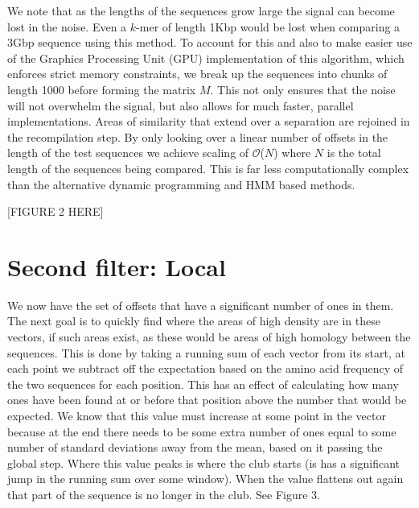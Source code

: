 \documentclass[phd,tocprelim]{cornell}
\renewcommand{\caption}[1]{\singlespacing\hangcaption{#1}\normalspacing}
\begin{document}
We note that as the lengths of the sequences grow large the signal can become lost in the noise. Even a $k$-mer of length 1Kbp would be lost when comparing a 3Gbp sequence using this method. To account for this and also to make easier use of the Graphics Processing Unit (GPU) implementation of this algorithm, which enforces strict memory constraints, we break up the sequences into chunks of length 1000 before forming the matrix $M$. This not only ensures that the noise will not overwhelm the signal, but also allows for much faster, parallel implementations. Areas of similarity that extend over a separation are rejoined in the recompilation step. By only looking over a linear number of offsets in the length of the test sequences we achieve scaling of
$\mathcal O$($N$) where $N$ is the total length of the sequences
being compared. This is far less computationally complex than the alternative dynamic programming and HMM based methods.

[FIGURE 2 HERE]


\section{Second filter: Local}

We now have the set of offsets that have a significant number of ones in them. The next goal is to quickly find where the areas of high density are in these vectors, if such areas exist, as these would be areas of high homology between the sequences. This is done by taking a running sum of each vector from its start, at each point we subtract off the expectation based on the amino acid frequency of the two sequences for each position. This has an effect of calculating how many ones have been found at or before that position above the number that would be expected. We know that this value must increase at some point in the vector because at the end there needs to be some extra number of ones equal to some number of standard deviations away from the mean, based on it passing the global step. Where this value peaks is where the club starts (is has a significant jump in the running sum over some window). When the value flattens out again that part of the sequence is no longer in the club. See Figure 3.
\end{document}
